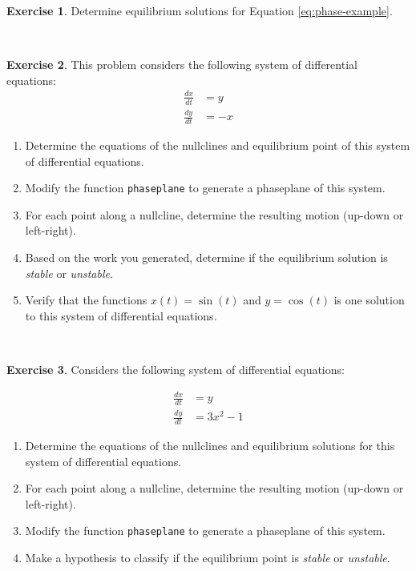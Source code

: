 \documentclass[
]{book}
\theoremstyle{definition}
\theoremstyle{definition}
\theoremstyle{definition}
\newtheorem{exercise}{Exercise}[chapter]
\theoremstyle{remark}
\begin{document}
\begin{exercise}
\protect\hypertarget{exr:unnamed-chunk-102}{}{\label{exr:unnamed-chunk-102} }Determine equilibrium solutions for Equation \eqref{eq:phase-example}.
\end{exercise}

~

\begin{exercise}
\protect\hypertarget{exr:unnamed-chunk-103}{}{\label{exr:unnamed-chunk-103} }This problem considers the following system of differential equations:
\begin{align*} 
\frac{dx}{dt} &= y \\ 
\frac{dy}{dt} &= -x 
\end{align*}

\begin{enumerate}[label=\alph*.]
\item Determine the equations of the nullclines and equilibrium point of this system of differential equations.
\item Modify the function \texttt{phaseplane} to generate a phaseplane of this system.
\item For each point along a nullcline, determine the resulting motion (up-down or left-right).
\item Based on the work you generated, determine if the equilibrium solution is \emph{stable} or \emph{unstable}.
\item Verify that the functions $x(t) = \sin(t)$ and $y=\cos(t)$ is one solution to this system of differential equations.
\end{enumerate}
\end{exercise}

~

\begin{exercise}
\protect\hypertarget{exr:unnamed-chunk-104}{}{\label{exr:unnamed-chunk-104} }Considers the following system of differential equations:

\begin{equation} 
\begin{split}
\frac{dx}{dt} &= y \\ 
\frac{dy}{dt} &= 3x^{2}-1 
\end{split}
\end{equation}

\begin{enumerate}[label=\alph*.]
 \item Determine the equations of the nullclines and equilibrium solutions for this system of differential equations.
\item For each point along a nullcline, determine the resulting motion (up-down or left-right).
\item Modify the function \texttt{phaseplane} to generate a phaseplane of this system.
\item  Make a hypothesis to classify if the equilibrium point is \emph{stable} or \emph{unstable}.
\end{enumerate} 
\end{exercise}
\end{document}

